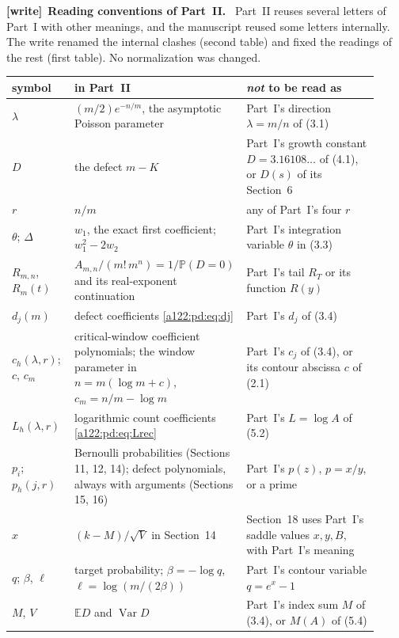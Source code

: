 \documentclass[11pt,letterpaper]{article}
\newenvironment{writenote}[1][]{\par\smallskip\begingroup\small
 \noindent\textbf{[write]}\if\relax\detokenize{#1}\relax\else~\textbf{#1.}\fi\ }%
 {\par\endgroup\smallskip}
\numberwithin{equation}{subsection}
\theoremstyle{definition}
\theoremstyle{remark}
\theoremstyle{plain}
\newcommand{\E}{\mathbb E}
\newcommand{\Prob}{\mathbb P}
\newcommand{\Var}{\operatorname{Var}}
\begin{document}
\begin{writenote}[Reading conventions of Part~II]
Part~II reuses several letters of Part~I with other meanings, and the
manuscript reused some letters internally. The write renamed the
internal clashes (second table) and fixed the readings of the rest (first
table). No normalization was changed.

\renewcommand{\theHtable}{readingtable.\arabic{table}}%
\setlength{\LTleft}{0pt}
\begin{longtable}{@{}>{\raggedright\arraybackslash}p{0.17\linewidth}
 >{\raggedright\arraybackslash}p{0.39\linewidth}
 >{\raggedright\arraybackslash}p{0.36\linewidth}@{}}
\toprule
symbol & in Part~II & \emph{not} to be read as \\
\midrule
\endhead
$\lambda$ & $(m/2)e^{-n/m}$, the asymptotic Poisson parameter & Part~I's direction $\lambda=m/n$ of (3.1) \\
$D$ & the defect $m-K$ & Part~I's growth constant $D=3.16108\ldots$ of (4.1), or $D(s)$ of its Section~6 \\
$r$ & $n/m$ & any of Part~I's four $r$ \\
$\theta$; $\Delta$ & $w_1$, the exact first coefficient; $w_1^2-2w_2$ & Part~I's integration variable $\theta$ in (3.3) \\
$R_{m,n}$, $R_m(t)$ & $A_{m,n}/(m!\,m^n)=1/\Prob(D=0)$ and its real-exponent continuation & Part~I's tail $R_T$ or its function $R(y)$ \\
$d_j(m)$ & defect coefficients \eqref{a122:pd:eq:dj} & Part~I's $d_j$ of (3.4) \\
$c_h(\lambda,r)$; $c$, $c_m$ & critical-window coefficient polynomials; the window parameter in $n=m(\log m+c)$, $c_m=n/m-\log m$ & Part~I's $c_j$ of (3.4), or its contour abscissa $c$ of (2.1) \\
$L_h(\lambda,r)$ & logarithmic count coefficients \eqref{a122:pd:eq:Lrec} & Part~I's $L=\log A$ of (5.2) \\
$p_i$; $p_h(j,r)$ & Bernoulli probabilities (Sections 11, 12, 14); defect polynomials, always with arguments (Sections 15, 16) & Part~I's $p(z)$, $p=x/y$, or a prime \\
$x$ & $(k-M)/\sqrt V$ in Section~14 & Section~18 uses Part~I's saddle values $x,y,B$, with Part~I's meaning \\
$q$; $\beta$, $\ell$ & target probability; $\beta=-\log q$, $\ell=\log(m/(2\beta))$ & Part~I's contour variable $q=e^x-1$ \\
$M$, $V$ & $\E D$ and $\Var D$ & Part~I's index sum $M$ of (3.4), or $M(A)$ of (5.4) \\

\end{longtable}
\end{writenote}
\end{document}
